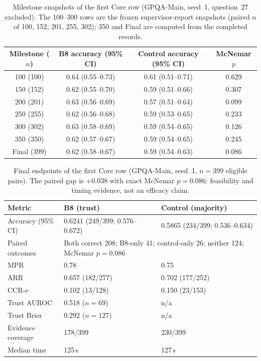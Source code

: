 \begin{table}[H]
  \centering
  \caption{Milestone snapshots of the first Core row (GPQA-Main, seed~1, question~27 excluded). The 100--300 rows are the frozen supervisor-report snapshots (paired $n$ of 100, 152, 201, 255, 302); 350 and Final are computed from the completed records.}
  \renewcommand{\arraystretch}{1.25}
  \small
  \begin{tabular}{|c|c|c|c|}
    \hline
    Milestone ($n$) & B8 accuracy (95\% CI) & Control accuracy (95\% CI) & McNemar $p$ \\
    \hline
    100 (100) & 0.64 (0.55--0.73) & 0.61 (0.51--0.71) & 0.629 \\
    \hline
    150 (152) & 0.62 (0.55--0.70) & 0.59 (0.51--0.66) & 0.307 \\
    \hline
    200 (201) & 0.63 (0.56--0.69) & 0.57 (0.51--0.64) & 0.099 \\
    \hline
    250 (255) & 0.62 (0.56--0.68) & 0.59 (0.53--0.65) & 0.233 \\
    \hline
    300 (302) & 0.63 (0.58--0.69) & 0.59 (0.54--0.65) & 0.126 \\
    \hline
    350 (350) & 0.62 (0.57--0.67) & 0.59 (0.54--0.65) & 0.245 \\
    \hline
    Final (399) & 0.62 (0.58--0.67) & 0.59 (0.54--0.63) & 0.086 \\
    \hline
  \end{tabular}
  \label{tab:core-milestones}
\end{table}

\begin{table}[H]
  \centering
  \caption{Final endpoints of the first Core row (GPQA-Main, seed~1, $n=399$ eligible pairs). The paired gap is +0.038 with exact McNemar $p=0.086$: feasibility and timing evidence, not an efficacy claim.}
  \renewcommand{\arraystretch}{1.25}
  \small
  \begin{tabular}{|p{}|p{}|p{}|}
    \hline
    Metric & B8 (trust) & Control (majority) \\
    \hline
    Accuracy (95\% CI) & 0.6241 (249/399; 0.576--0.672) & 0.5865 (234/399; 0.536--0.634) \\
    \hline
    Paired outcomes & \multicolumn{2}{p{0.60\textwidth}|}{Both correct 208; B8-only 41; control-only 26; neither 124; McNemar $p=0.086$} \\
    \hline
    MPR & 0.78 & 0.75 \\
    \hline
    ARR & 0.657 (182/277) & 0.702 (177/252) \\
    \hline
    CCR-e & 0.102 (13/128) & 0.150 (23/153) \\
    \hline
    Trust AUROC & 0.518 ($n=69$) & n/a \\
    \hline
    Trust Brier & 0.292 ($n=127$) & n/a \\
    \hline
    Evidence coverage & 178/399 & 230/399 \\
    \hline
    Median time & 125\,s & 127\,s \\
    \hline
  \end{tabular}
  \label{tab:core-final}
\end{table}

